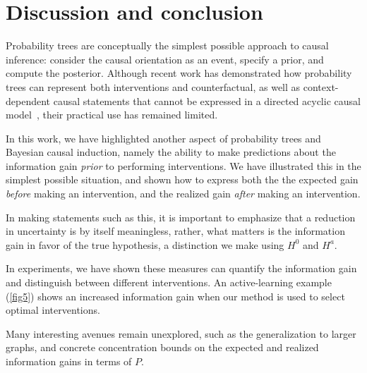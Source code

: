 \documentclass[letterpaper]{article} %
\begin{document}
\section{Discussion and conclusion}
Probability trees are conceptually the simplest possible approach to causal inference: consider the causal orientation as an event, specify a prior, and compute the posterior. Although recent work has demonstrated how probability trees can represent both interventions and counterfactual, as well as context-dependent causal statements that cannot be expressed in a directed acyclic causal model~\cite{genewein2020algorithms}, their practical use has remained limited.

In this work, we have highlighted another aspect of probability trees and Bayesian causal induction, namely the ability to make predictions about the information gain \emph{prior} to performing interventions. We have illustrated this in the simplest possible situation, and shown how to express both the the expected gain \emph{before} making an intervention, and the realized gain \emph{after} making an intervention. %


In making statements such as this, it is important to emphasize that a reduction in uncertainty is by itself meaningless, rather, what matters is the information gain in favor of the true hypothesis, a distinction we make using $H^0$ and $H^a$.

In experiments, we have shown these measures can quantify the information gain and distinguish between different interventions. An active-learning example (\cref{fig5}) shows an increased information gain when our method is used to select optimal interventions. %

Many interesting avenues remain unexplored, such as the generalization to larger graphs, and concrete concentration bounds on the expected and realized information gains in terms of $P$. 






\end{document}
